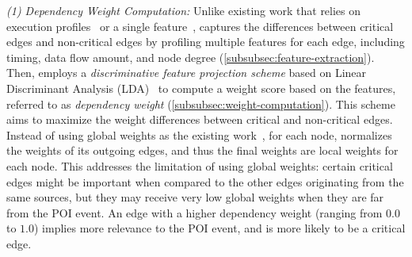 \emph{(1) Dependency Weight Computation:}
Unlike existing work that relies on execution profiles~\cite{hassan2019nodoze} or a single feature~\cite{liu2018priotracker}, \tool captures the differences between critical edges and non-critical edges by profiling multiple features for each edge, including timing, data flow amount, and node degree (\cref{subsubsec:feature-extraction}).
Then, \tool employs a \emph{discriminative feature projection scheme} based on Linear Discriminant Analysis (LDA)~\cite{Mika99fisherdiscriminant} to compute a weight score based on the features, referred to as \emph{dependency weight} (\cref{subsubsec:weight-computation}). 
This scheme aims to maximize the weight differences between critical and non-critical edges.
Instead of using global weights as the existing work~\cite{hassan2019nodoze}, for each node, \tool normalizes the weights of its outgoing edges, and thus the final weights are local weights for each node. This addresses the limitation of using global weights: certain critical edges might be important when compared to the other edges originating from the same sources, but they may receive very low global weights when they are far from the POI event.
An edge with a higher dependency weight (ranging from $0.0$ to $1.0$) implies more relevance to the POI event, and is more likely to be a critical edge.

